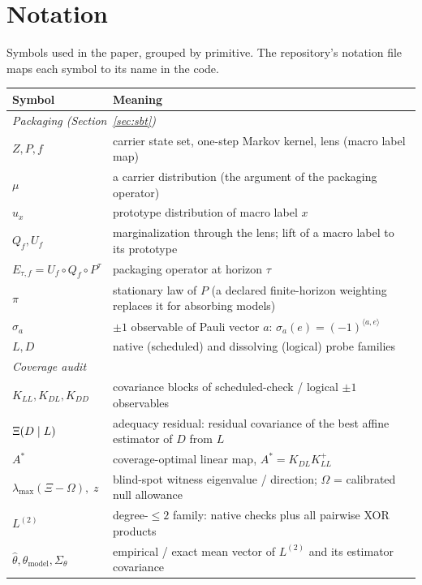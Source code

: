 \section{Notation}
\label{app:notation}

Symbols used in the paper, grouped by primitive. The repository's notation file maps each symbol to its name in the code.

\begin{table}[H]
\centering\small
\begin{tabular}{l p{10.5cm}}
\toprule
Symbol & Meaning \\
\midrule
\multicolumn{2}{l}{\emph{Packaging (Section~\ref{sec:sbt})}} \\
$Z, P, f$ & carrier state set, one-step Markov kernel, lens (macro label map) \\
$\mu$ & a carrier distribution (the argument of the packaging operator) \\
$u_x$ & prototype distribution of macro label $x$ \\
$Q_f, U_f$ & marginalization through the lens; lift of a macro label to its prototype \\
$E_{\tau,f} = U_f \circ Q_f \circ P^{\tau}$ & packaging operator at horizon $\tau$ \\
$\pi$ & stationary law of $P$ (a declared finite-horizon weighting replaces it for absorbing models) \\
$\sigma_a$ & $\pm1$ observable of Pauli vector $a$: $\sigma_a(e) = (-1)^{\langle a, e\rangle}$ \\
$L, D$ & native (scheduled) and dissolving (logical) probe families \\
\multicolumn{2}{l}{\emph{Coverage audit}} \\
$K_{LL}, K_{DL}, K_{DD}$ & covariance blocks of scheduled-check / logical $\pm1$ observables \\
$\Xi(D \mid L)$ & adequacy residual: residual covariance of the best affine estimator of $D$ from $L$ \\
$A^{*}$ & coverage-optimal linear map, $A^{*} = K_{DL}K_{LL}^{+}$ \\
$\lambda_{\max}(\Xi - \Omega),\; z$ & blind-spot witness eigenvalue / direction; $\Omega$ = calibrated null allowance \\
$L^{(2)}$ & degree-$\le2$ family: native checks plus all pairwise XOR products \\
$\hat\theta, \theta_{\mathrm{model}}, \Sigma_\theta$ & empirical / exact mean vector of $L^{(2)}$ and its estimator covariance \\

\end{tabular}
\end{table}

